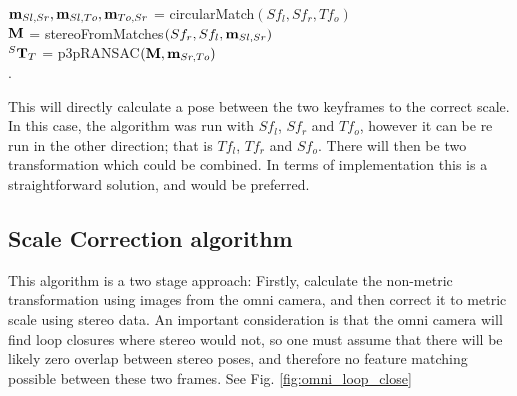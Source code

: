 \begin{algorithm}[h!]
 $\mathbf m_{Sl,Sr},\mathbf m_{Sl,To},\mathbf m_{To,Sr}$ = circularMatch$(Sf_{l}, Sf_r, Tf_o)$ \\
\vspace{0.4em}
 $\mathbf{M}$ = stereoFromMatches$(Sf_r, Sf_l, \mathbf m_{Sl, Sr})$ \\
\vspace{0.4em}
 $^S \mathbf T _T$ = p3pRANSAC$(\mathbf{M}, \mathbf{m}_{Sr,To})$ \\
\vspace{0.4em}
. 
\end{algorithm}


This will directly calculate a pose between the two keyframes to the correct scale.  In this case, the algorithm was run with $Sf_l$, $Sf_r$ and $Tf_o$, however it can be re run in the other direction; that is $Tf_l$, $Tf_r$ and $Sf_o$.  There will then be two transformation which could be combined.  In terms of implementation this is a straightforward solution, and would be preferred.  

\subsection{Scale Correction algorithm}

This algorithm is a two stage approach: Firstly, calculate the non-metric transformation using images from the omni camera, and then correct it to metric scale using stereo data.  An important consideration is that the omni camera will find loop closures where stereo would not, so one must assume that there will be likely zero overlap between stereo poses, and therefore no feature matching possible between these two frames. See Fig. \ref{fig:omni_loop_close}


